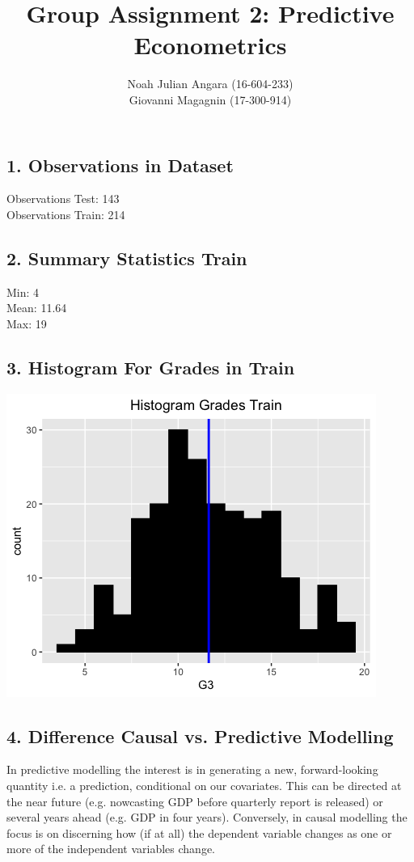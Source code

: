 \documentclass[a4paper,11pt]{article}
\begin{document}
\title{\textbf{Group Assignment 2: Predictive Econometrics}}
\author{Noah Julian Angara (16-604-233)\\
Giovanni Magagnin (17-300-914)}
\maketitle

\subsection*{1. Observations in Dataset}
Observations Test: 143\\
Observations Train: 214
\subsection*{2. Summary Statistics Train}
Min: 4\\
Mean: 11.64\\
Max: 19\\
\subsection*{3. Histogram For Grades in Train}
\begin{center}
\includegraphics[scale = 0.8]{"histogram.png"}
\end{center}
\subsection*{4. Difference Causal vs. Predictive Modelling}
In predictive modelling the interest is in generating a new, forward-looking quantity i.e. a prediction, conditional on our covariates. This can be directed at the near future (e.g. nowcasting GDP before quarterly report is released) or several years ahead (e.g. GDP in four years). Conversely, in causal modelling the focus is on discerning how (if at all) the dependent variable changes as one or more of the independent variables change.
\end{document}
